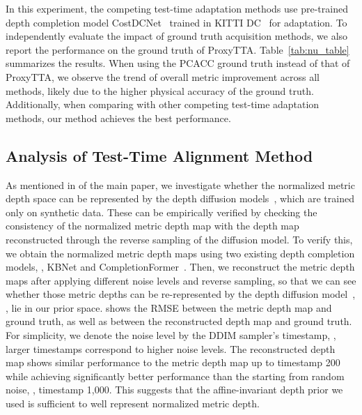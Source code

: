 In this experiment, the competing test-time adaptation methods use pre-trained depth completion model CostDCNet~\cite{kam2022costdcnet} trained in KITTI DC~\cite{uhrig2017sparsity} for adaptation. To independently evaluate the impact of ground truth acquisition methods, we also report the performance on the ground truth of ProxyTTA. 
Table~\ref{tab:nu_table} summarizes the results. When using the PCACC ground truth instead of that of ProxyTTA, we observe the trend of overall metric improvement across all methods, likely due to the higher physical accuracy of the ground truth. Additionally, when comparing with other competing test-time adaptation methods, our method achieves the best performance.



\subsection{Analysis of Test-Time Alignment Method}
As mentioned in  of the main paper, we investigate whether the normalized metric depth space can be represented by 
the depth diffusion models~\cite{ke2023repurposing, gui2024depthfm}, which are trained only on synthetic data.
These can be empirically verified
by checking the consistency of the normalized metric depth map with the depth map reconstructed through the reverse sampling of the diffusion model.
To verify this, we obtain the normalized metric depth maps using two existing depth completion models, \ie, KBNet and CompletionFormer~\cite{wong2021unsupervised,zhang2023completionformer}. Then, we reconstruct the metric depth maps after applying different noise levels and reverse sampling, so that we can see whether those metric depths can be re-represented by the depth diffusion model~\cite{ke2023repurposing}, \ie, lie in our prior space.  shows the RMSE between the metric depth map and ground truth, as well as between the reconstructed depth map and ground truth. 
For simplicity, we denote the noise level by the DDIM sampler's timestamp, \ie, larger timestamps correspond to higher noise levels. 
The reconstructed depth map shows similar performance to the metric depth map up to timestamp 200 while achieving significantly better performance than the starting from random noise, \ie, timestamp 1,000.
This suggests that the affine-invariant depth prior we used is sufficient to well represent normalized metric depth.


